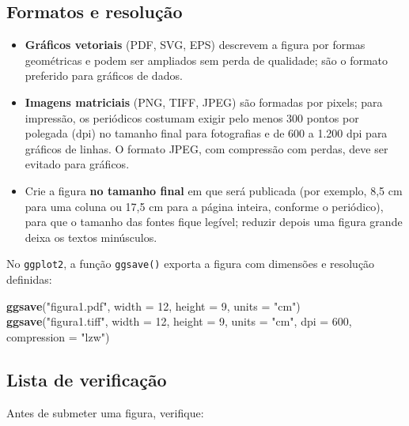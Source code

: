 \documentclass[
]{book}
\newenvironment{Shaded}{\begin{snugshade}}{\end{snugshade}}
\newcommand{\AttributeTok}[1]{\textcolor[rgb]{0.13,0.29,0.53}{#1}}
\newcommand{\DecValTok}[1]{\textcolor[rgb]{0.00,0.00,0.81}{#1}}
\newcommand{\FunctionTok}[1]{\textcolor[rgb]{0.13,0.29,0.53}{\textbf{#1}}}
\newcommand{\NormalTok}[1]{#1}
\newcommand{\StringTok}[1]{\textcolor[rgb]{0.31,0.60,0.02}{#1}}
\providecommand{\tightlist}{%
  \setlength{\itemsep}{0pt}\setlength{\parskip}{0pt}}
\begin{document}
\subsection{Formatos e resolução}\label{formatos-e-resoluuxe7uxe3o}

\begin{itemize}
\tightlist
\item
  \textbf{Gráficos vetoriais} (PDF, SVG, EPS) descrevem a figura por formas geométricas e podem ser ampliados sem perda de qualidade; são o formato preferido para gráficos de dados.
\item
  \textbf{Imagens matriciais} (PNG, TIFF, JPEG) são formadas por pixels; para impressão, os periódicos costumam exigir pelo menos 300 pontos por polegada (dpi) no tamanho final para fotografias e de 600 a 1.200 dpi para gráficos de linhas. O formato JPEG, com compressão com perdas, deve ser evitado para gráficos.
\item
  Crie a figura \textbf{no tamanho final} em que será publicada (por exemplo, 8,5 cm para uma coluna ou 17,5 cm para a página inteira, conforme o periódico), para que o tamanho das fontes fique legível; reduzir depois uma figura grande deixa os textos minúsculos.
\end{itemize}

No \texttt{ggplot2}, a função \texttt{ggsave()} exporta a figura com dimensões e resolução definidas:

\begin{Shaded}
\begin{Highlighting}[]
\FunctionTok{ggsave}\NormalTok{(}\StringTok{"figura1.pdf"}\NormalTok{, }\AttributeTok{width =} \DecValTok{12}\NormalTok{, }\AttributeTok{height =} \DecValTok{9}\NormalTok{, }\AttributeTok{units =} \StringTok{"cm"}\NormalTok{)}
\FunctionTok{ggsave}\NormalTok{(}\StringTok{"figura1.tiff"}\NormalTok{, }\AttributeTok{width =} \DecValTok{12}\NormalTok{, }\AttributeTok{height =} \DecValTok{9}\NormalTok{, }\AttributeTok{units =} \StringTok{"cm"}\NormalTok{, }\AttributeTok{dpi =} \DecValTok{600}\NormalTok{, }\AttributeTok{compression =} \StringTok{"lzw"}\NormalTok{)}
\end{Highlighting}
\end{Shaded}

\subsection{Lista de verificação}\label{lista-de-verificauxe7uxe3o}

Antes de submeter uma figura, verifique:
\end{document}
